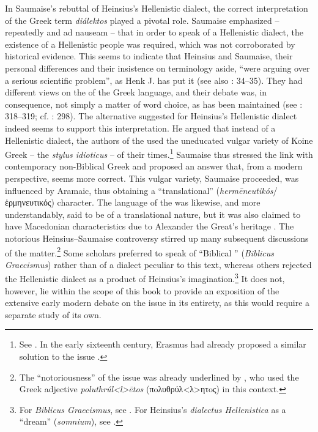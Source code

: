 In Saumaise’s rebuttal of Heinsius’s Hellenistic dialect, the correct interpretation of the Greek term \textit{diálektos} played a pivotal role. Saumaise emphasized – repeatedly and ad nauseam – that in order to speak of a Hellenistic dialect, the existence of a Hellenistic people was required, which was not corroborated by historical evidence. This seems to indicate that Heinsius and Saumaise, their personal differences and their insistence on terminology aside, “were arguing over a serious scientific problem”, as Henk J. \citet[117]{De1981} has put it (see also \citealt{De1980}: 34–35). They had different views on the  of the Greek language, and their debate was, in consequence, not simply a matter of word choice, as has been maintained (see \citealt{Simon1689}: 318--319; cf. \citealt{Considine2012}: 298). The alternative \citet[98–99, 240–266]{Saumaise1643a} suggested for Heinsius’s Hellenistic dialect indeed seems to support this interpretation. He argued that instead of a Hellenistic dialect, the authors of the  used the uneducated vulgar variety of Koine Greek – the \textit{stylus idioticus} – of their times.\footnote{See \citet[34--35]{De1980}. In the early sixteenth century, Erasmus had already proposed a similar solution to the issue \citep[181]{Bentley1983}.} Saumaise thus stressed the link with contemporary non-Biblical Greek and proposed an answer that, from a modern perspective, seems more correct. This vulgar variety, Saumaise proceeded, was influenced by Aramaic, thus obtaining a “translational” (\textit{hermēneutikós}/ἑρμηνευτικός) character. The language of the  was likewise, and more understandably, said to be of a translational nature, but it was also claimed to have Macedonian characteristics due to Alexander the Great’s heritage \citep[264]{Saumaise1643a}. The notorious Heinsius–Saumaise controversy stirred up many subsequent discussions of the matter.\footnote{The “notoriousness” of the issue was already underlined by \citet[\textsc{ii.}74]{Morhof1708}, who used the Greek adjective \textit{poluthrúl<l>ētos}  (πoλυθρύλ<λ>ητoς) in this context.} Some scholars preferred to speak of “Biblical ” (\textit{Biblicus Graecismus}) rather than of a dialect peculiar to this text, whereas others rejected the Hellenistic dialect as a product of Heinsius’s imagination.\footnote{For \textit{Biblicus Graecismus}, see \citet[\textsc{b.3}\textsc{\textsuperscript{v}}]{Bolius1689}. For Heinsius’s \textit{dialectus Hellenistica} as a “dream” (\textit{somnium}), see \citet{De1644}.} It does not, however, lie within the scope of this book to provide an exposition of the extensive early modern debate on the issue in its entirety, as this would require a separate study of its own.

